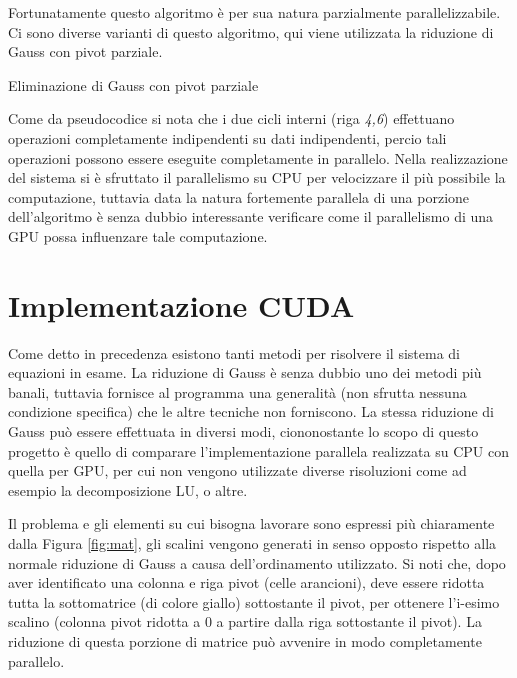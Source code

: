 \documentclass{article}
\begin{document}
Fortunatamente questo algoritmo è per sua natura parzialmente parallelizzabile. Ci sono diverse varianti di questo algoritmo, qui viene utilizzata la riduzione di Gauss con pivot parziale. 

\begin{algorithm}[H]
\SetAlgoLined
{}

 \caption{Eliminazione di Gauss con pivot parziale}
\end{algorithm}

Come da pseudocodice si nota che i due cicli interni (riga \textit{4,6}) effettuano operazioni completamente indipendenti su dati indipendenti, percio tali operazioni possono essere eseguite completamente in parallelo. Nella realizzazione del sistema si è sfruttato il parallelismo su CPU per velocizzare il più possibile la computazione, tuttavia data la natura fortemente parallela di una porzione dell'algoritmo è senza dubbio interessante verificare come il parallelismo di una GPU possa influenzare tale computazione.

\section{Implementazione CUDA}

Come detto in precedenza esistono tanti metodi per risolvere il sistema di equazioni in esame. La riduzione di Gauss è senza dubbio uno dei metodi più banali, tuttavia fornisce al programma una generalità (non sfrutta nessuna condizione specifica) che le altre tecniche non forniscono. La stessa riduzione di Gauss può essere effettuata in diversi modi, ciononostante lo scopo di questo progetto è quello di comparare l'implementazione parallela realizzata su CPU con quella per GPU, per cui non vengono utilizzate diverse risoluzioni come ad esempio la decomposizione LU, o altre.

Il problema e gli elementi su cui bisogna lavorare sono espressi più chiaramente dalla Figura \ref{fig:mat}, gli scalini vengono generati in senso opposto rispetto alla normale riduzione di Gauss a causa dell'ordinamento utilizzato. Si noti che, dopo aver identificato una colonna e riga pivot (celle arancioni), deve essere ridotta tutta la sottomatrice (di colore giallo) sottostante il pivot, per ottenere l'i-esimo scalino (colonna pivot ridotta a 0 a partire dalla riga sottostante il pivot). La riduzione di questa porzione di matrice può avvenire in modo completamente parallelo.
\end{document}
